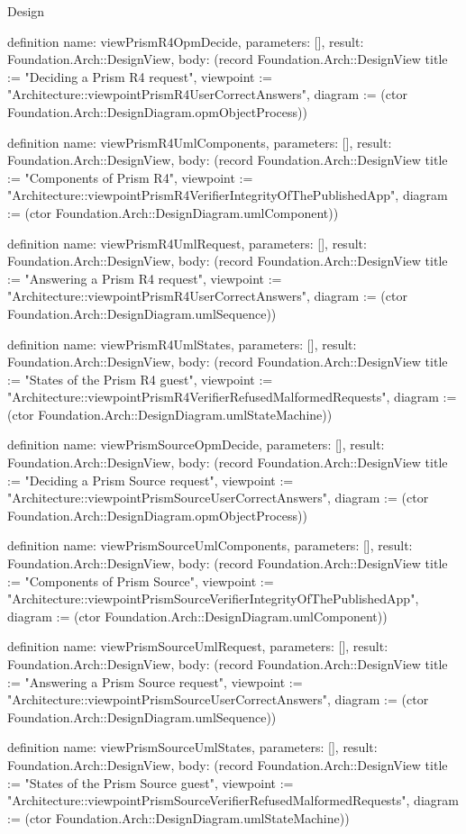 \begin{lexlean}{Design}
\begin{semanticmodule}
definition{
  name: viewPrismR4OpmDecide,
  parameters: [],
  result: Foundation.Arch::DesignView,
  body: (record Foundation.Arch::DesignView {title := "Deciding a Prism R4 request", viewpoint := "Architecture::viewpointPrismR4UserCorrectAnswers", diagram := (ctor Foundation.Arch::DesignDiagram.opmObjectProcess)})
}

definition{
  name: viewPrismR4UmlComponents,
  parameters: [],
  result: Foundation.Arch::DesignView,
  body: (record Foundation.Arch::DesignView {title := "Components of Prism R4", viewpoint := "Architecture::viewpointPrismR4VerifierIntegrityOfThePublishedApp", diagram := (ctor Foundation.Arch::DesignDiagram.umlComponent)})
}

definition{
  name: viewPrismR4UmlRequest,
  parameters: [],
  result: Foundation.Arch::DesignView,
  body: (record Foundation.Arch::DesignView {title := "Answering a Prism R4 request", viewpoint := "Architecture::viewpointPrismR4UserCorrectAnswers", diagram := (ctor Foundation.Arch::DesignDiagram.umlSequence)})
}

definition{
  name: viewPrismR4UmlStates,
  parameters: [],
  result: Foundation.Arch::DesignView,
  body: (record Foundation.Arch::DesignView {title := "States of the Prism R4 guest", viewpoint := "Architecture::viewpointPrismR4VerifierRefusedMalformedRequests", diagram := (ctor Foundation.Arch::DesignDiagram.umlStateMachine)})
}

definition{
  name: viewPrismSourceOpmDecide,
  parameters: [],
  result: Foundation.Arch::DesignView,
  body: (record Foundation.Arch::DesignView {title := "Deciding a Prism Source request", viewpoint := "Architecture::viewpointPrismSourceUserCorrectAnswers", diagram := (ctor Foundation.Arch::DesignDiagram.opmObjectProcess)})
}

definition{
  name: viewPrismSourceUmlComponents,
  parameters: [],
  result: Foundation.Arch::DesignView,
  body: (record Foundation.Arch::DesignView {title := "Components of Prism Source", viewpoint := "Architecture::viewpointPrismSourceVerifierIntegrityOfThePublishedApp", diagram := (ctor Foundation.Arch::DesignDiagram.umlComponent)})
}

definition{
  name: viewPrismSourceUmlRequest,
  parameters: [],
  result: Foundation.Arch::DesignView,
  body: (record Foundation.Arch::DesignView {title := "Answering a Prism Source request", viewpoint := "Architecture::viewpointPrismSourceUserCorrectAnswers", diagram := (ctor Foundation.Arch::DesignDiagram.umlSequence)})
}

definition{
  name: viewPrismSourceUmlStates,
  parameters: [],
  result: Foundation.Arch::DesignView,
  body: (record Foundation.Arch::DesignView {title := "States of the Prism Source guest", viewpoint := "Architecture::viewpointPrismSourceVerifierRefusedMalformedRequests", diagram := (ctor Foundation.Arch::DesignDiagram.umlStateMachine)})
}


\end{semanticmodule}
\end{lexlean}
